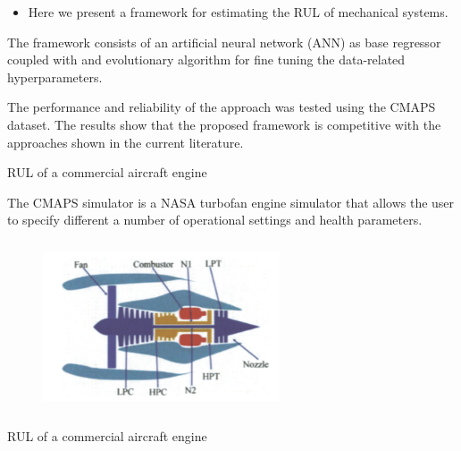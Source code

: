 \documentclass{beamer}
\begin{document}
\begin{darkframes}
\begin{frame}
\begin{itemize}
		\item Here we present a framework for estimating the RUL of mechanical systems.
		
	\end{itemize}
         
    \end{frame}
    
    \begin{frame}
    
    The framework consists of an artificial neural network (ANN) as base regressor coupled with and evolutionary algorithm for fine tuning the data-related hyperparameters. \vspace{1em}
	
	The performance and reliability of the approach was tested using the CMAPS dataset. The results show that the proposed framework is competitive with the approaches shown in the current literature. 
      
    \end{frame}
      
    \begin{frame}{RUL of a commercial aircraft engine}
      
      The CMAPS simulator is a NASA turbofan engine simulator that allows the user to specify different a number of operational settings and health parameters. 
      
      \begin{figure}[!htb]
		\begin{center}
			\includegraphics[width=70mm, height=50mm]{resources/cmaps_model.png}
			\label{fig:cmaps}
		\end{center}
	\end{figure}
      
    \end{frame}
    
    \begin{frame}{RUL of a commercial aircraft engine}
      

\end{frame}
\end{darkframes}
\end{document}
